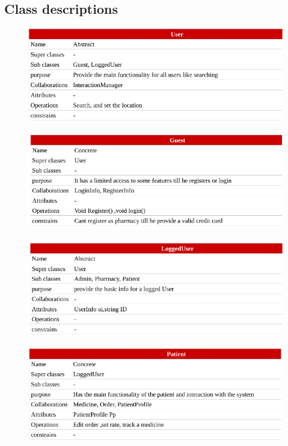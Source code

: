 \documentclass[]{article}
\begin{document}
\subsection{Class descriptions}
\begin{figure}[H]
\centering
\includegraphics[scale=0.4]{./classdiagram/description/01}
\end{figure}
\begin{figure}[H]
\centering
\includegraphics[scale=0.4]{./classdiagram/description/02}
\end{figure}
\begin{figure}[H]
\centering
\includegraphics[scale=0.4]{./classdiagram/description/03}
\end{figure}
\begin{figure}[H]
\centering
\includegraphics[scale=0.4]{./classdiagram/description/04}
\end{figure}
\end{document}
